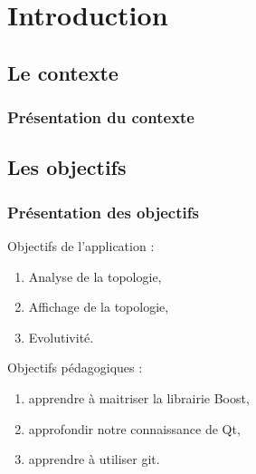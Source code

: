 \section*{Introduction}

\subsection*{Le contexte}
\frame
{
\frametitle{Pr\'esentation du contexte}


}

\subsection*{Les objectifs}
\frame
{
\frametitle{Pr\'esentation des objectifs}
Objectifs de l'application :
\begin{enumerate}
 \item Analyse de la topologie,
 \item Affichage de la topologie,
 \item Evolutivit\'e.
\end{enumerate}

Objectifs p\'edagogiques :
\begin{enumerate}
 \item apprendre \`a maitriser la librairie Boost,
 \item approfondir notre connaissance de Qt,
 \item apprendre \`a utiliser git.
\end{enumerate}



}